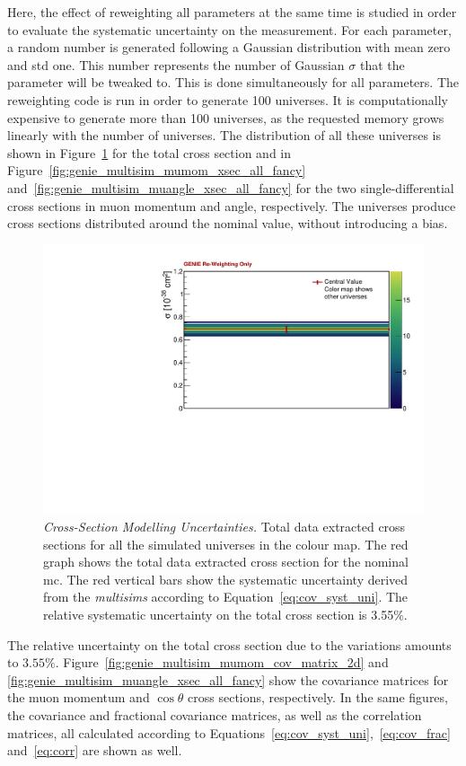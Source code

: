 Here, the effect of reweighting all \g parameters at the same time is studied in order to evaluate the systematic uncertainty on the measurement. For each parameter, a random number is generated following a Gaussian distribution with mean zero and \acrshort{std} one. This number represents the number of Gaussian $\sigma$ that the parameter will be tweaked to. This is done simultaneously for all parameters. 
The reweighting code is run in order to generate 100 universes. It is computationally expensive to generate more than 100 universes, as the requested memory grows linearly with the number of universes. 
The distribution of all these universes is shown in Figure~\ref{fig:genie_multisim_onebin} for the total cross section and in Figure~\ref{fig:genie_multisim_mumom_xsec_all_fancy} and~\ref{fig:genie_multisim_muangle_xsec_all_fancy} for the two single-differential cross sections in muon momentum and angle, respectively. 
The universes produce cross sections distributed around the nominal value, without introducing a bias. 

\begin{figure}[]
\centering
\includegraphics[width=.70\textwidth]{images/genie_covariance_plots/genie_multisim_onebin_xsec_all_fancy}
\caption[Cross-Section Modelling Uncertainties - Total Cross Section]{\emph{Cross-Section Modelling Uncertainties.} Total data extracted cross sections for all the simulated universes in the colour map. The red graph shows the total data extracted cross section for the nominal \acrshort{mc}. The red vertical bars show the \g systematic uncertainty derived from the \emph{multisims} according to Equation~\eqref{eq:cov_syst_uni}. The relative systematic uncertainty on the total cross section is 3.55\%.}
\label{fig:genie_multisim_onebin}
\end{figure}

The relative uncertainty on the total cross section due to the \g variations amounts to $3.55\%$. 
Figure~\ref{fig:genie_multisim_mumom_cov_matrix_2d} and \ref{fig:genie_multisim_muangle_xsec_all_fancy} show the covariance matrices for the muon momentum and $\cos\theta$ cross sections, respectively. In the same figures, the covariance and fractional covariance matrices, as well as the correlation matrices, all calculated according to Equations~\eqref{eq:cov_syst_uni},~\eqref{eq:cov_frac} and~\eqref{eq:corr} are shown as well.

